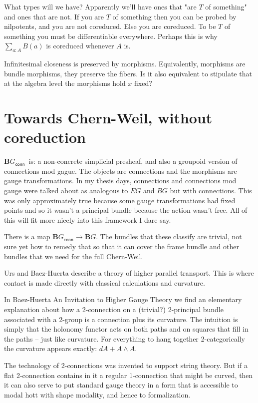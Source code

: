 \documentclass[12pt]{article}
\newcommand{\bg}{\ensuremath{\textbf{B}G}}
\newcommand{\bgconn}{\ensuremath{\textbf{B}G_{\textsf{conn}}}}
\begin{document}
What types will we have? Apparently we'll have ones that "are $T$ of something" and ones that are not. If you are $T$ of something then you can be probed by nilpotents, and you are not coreduced. Else you are coreduced. To be $T$ of something you must be differentiable everywhere. Perhaps this is why $\sum_{a:A}B(a)$ is coreduced whenever $A$ is.

Infinitesimal closeness is preserved by morphisms. Equivalently, morphisms are bundle morphisms, they preserve the fibers. Is it also equivalent to stipulate that at the algebra level the morphisms hold $x$ fixed?

\section{Towards Chern-Weil, without coreduction}
\bgconn\ is: a non-concrete simplicial presheaf, and also a groupoid version of connections mod gague. The objects are connections and the morphisms are gauge transformations. In my thesis days, connections and connections mod gauge were talked about as analogous to $EG$ and $BG$ but with connections. This was only approximately true because some gauge transformations had fixed points and so it wasn't a principal bundle because the action wasn't free. All of this will fit more nicely into this framework I dare say.

There is a map $\bgconn\to\bg$. The bundles that these classify are trivial, not sure yet how to remedy that so that it can cover the frame bundle and other bundles that we need for the full Chern-Weil.

Urs and Baez-Huerta describe a theory of higher parallel transport. This is where contact is made directly with classical calculations and curvature.

In Baez-Huerta An Invitation to Higher Gauge Theory we find an elementary explanation about how a 2-connection on a (trivial?) 2-principal bundle associated with a 2-group is a connection plus its curvature. The intuition is simply that the holonomy functor acts on both paths and on squares that fill in the paths -- just like curvature. For everything to hang together 2-categorically the curvature appears exactly: $dA + A\wedge A$.

The technology of 2-connections was invented to support string theory. But if a flat 2-connection contains in it a regular 1-connection that might be curved, then it can also serve to put standard gauge theory in a form that is accessible to modal hott with shape modality, and hence to formalization.
\end{document}

